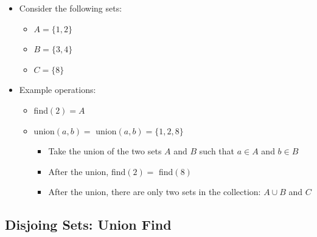 \documentclass[
  10pt,
  english,
  letterpaper,
,tablecaptionabove
]{scrartcl}
\providecommand{\tightlist}{%
  \setlength{\itemsep}{0pt}\setlength{\parskip}{0pt}}
\begin{document}
\begin{itemize}
\tightlist
\item
  Consider the following sets:

  \begin{itemize}
  \tightlist
  \item
    \(A = \{1, 2\}\)
  \item
    \(B = \{3, 4\}\)
  \item
    \(C = \{8\}\)
  \end{itemize}
\item
  Example operations:

  \begin{itemize}
  \tightlist
  \item
    find\((2) = A\)
  \item
    union\((a, b) =\) union\((a, b) = \{1, 2, 8\}\)

    \begin{itemize}
    \tightlist
    \item
      Take the union of the two sets \(A\) and \(B\) such that
      \(a\in A\) and \(b\in B\)
    \item
      After the union, find\((2) =\) find\((8)\)
    \item
      After the union, there are only two sets in the collection:
      \(A\cup B\) and \(C\)
    \end{itemize}
  \end{itemize}
\end{itemize}

\hypertarget{disjoing-sets-union-find}{%
\subsection{Disjoing Sets: Union Find}\label{disjoing-sets-union-find}}
\end{document}
